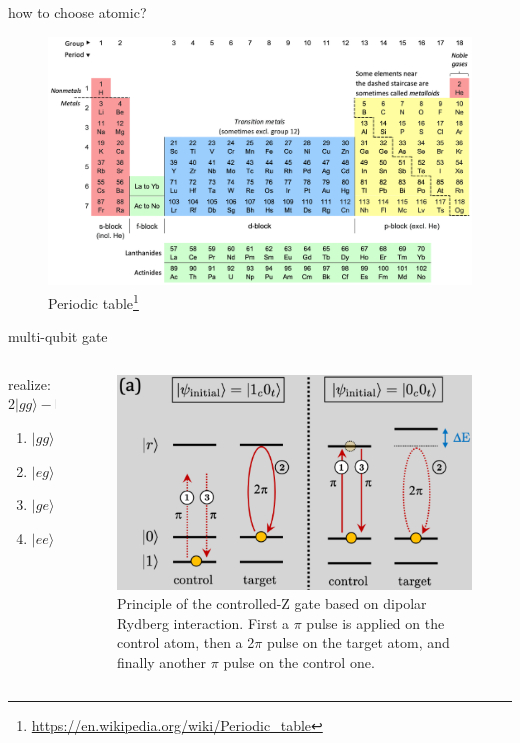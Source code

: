 \documentclass[18 pt]{beamer}
\begin{document}
\begin{frame}{how to choose atomic?}
  \begin{figure}
    \centering
    \includegraphics[width=.8\textwidth]{IMG/Colour_18-col_PT_with_labels}
    \caption{Periodic table\footnote{\url{https://en.wikipedia.org/wiki/Periodic_table}}}
  \end{figure}
\end{frame}
\begin{frame}{multi-qubit gate}
  \begin{columns}
    \begin{column}{.5\textwidth}
      realize: \(2|gg\rangle-\mathbb{I} \)
      \vspace{20pt}
      \begin{enumerate}
        \item \(|gg\rangle\to |gg\rangle \to |gg\rangle\)
        \item \(|eg\rangle\to |rg\rangle \to -|eg\rangle \)
        \item \(|ge\rangle\to |gr\rangle \to -|ge\rangle \)
        \item \(|ee\rangle\to |re\rangle \to -|ee\rangle \)
      \end{enumerate}
    \end{column}
    \begin{column}{.5\textwidth}
      \begin{figure}
        \includegraphics[width=\textwidth]{IMG/cz.png}
        \caption{Principle of the controlled-Z gate based on dipolar Rydberg interaction. First a $\pi$ pulse is applied on the control atom, then a 2$\pi$ pulse on the target atom, and finally another $\pi$ pulse on the control one.}
      \end{figure}
    \end{column}
  \end{columns}
\end{frame}
\end{document}

